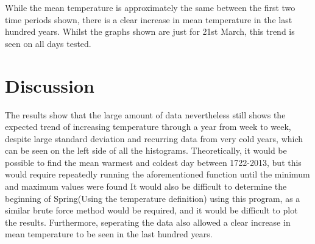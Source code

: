 \documentclass[a4paper,10pt,oneside]{article}
\begin{document}
While the mean temperature is approximately the same between the first two time periods
shown, there is a clear increase in mean temperature in the last hundred years. Whilst the graphs
shown are just for 21st March, this trend is seen on all days tested.


\section{Discussion}
\label{sec:conc}

The results show that the large amount of data nevertheless still shows the expected trend of increasing temperature through a year from week
to week, despite large standard deviation and recurring data from very cold years, which can be seen on
the left side of all the histograms. Theoretically, it would be possible to find the mean warmest and coldest day between 1722-2013,
but this would require repeatedly running the aforementioned function until the minimum and maximum values were found
It would also be difficult to determine the beginning of Spring(Using the temperature definition) using this program,
as a similar brute force method would be required, and it would be difficult to plot the results. Furthermore, seperating
the data also allowed a clear increase in mean temperature to be seen in the last hundred years.






 
\end{document}
